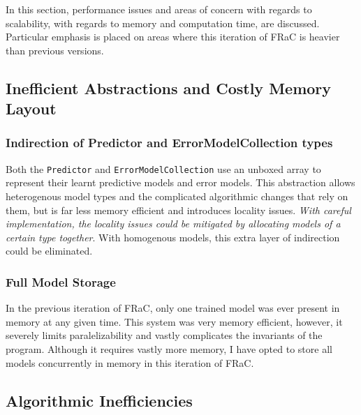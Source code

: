 \documentclass{article}
\begin{document}
\begin{multicols}{2}

In this section, performance issues and areas of concern with regards to scalability, with regards to memory and computation time, are discussed.  Particular emphasis is placed on areas where this iteration of FRaC is heavier than previous versions.

\subsection{Inefficient Abstractions and Costly Memory Layout}

\subsubsection{Indirection of Predictor and ErrorModelCollection types}
Both the \texttt{Predictor} and \texttt{ErrorModelCollection} use an unboxed array to represent their learnt predictive models and error models.  This abstraction allows heterogenous model types and the complicated algorithmic changes that rely on them, but is far less memory efficient and introduces locality issues.  \textit{With careful implementation, the locality issues could be mitigated by allocating models of a certain type together}.  With homogenous models, this extra layer of indirection could be eliminated.

\subsubsection{Full Model Storage}
In the previous iteration of FRaC, only one trained model was ever present in memory at any given time.  This system was very memory efficient, however, it severely limits paralelizability and vastly complicates the invariants of the program.  Although it requires vastly more memory, I have opted to store all models concurrently in memory in this iteration of FRaC.

\subsection{Algorithmic Inefficiencies}


\end{multicols}
\end{document}
